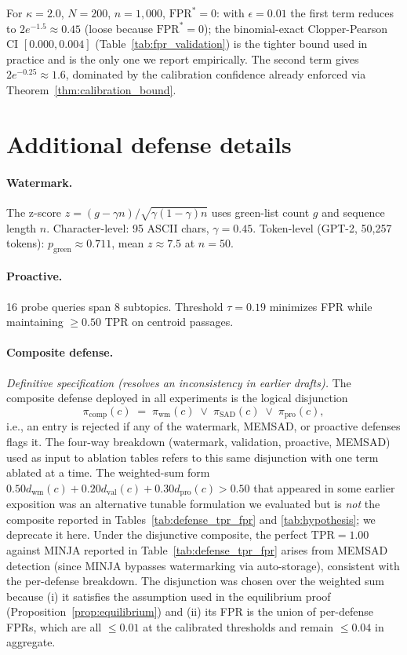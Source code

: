 \documentclass{article}
\theoremstyle{definition}
\newcommand{\tpr}{\text{TPR}}
\newcommand{\fpr}{\text{FPR}}
\newcommand{\minja}{\textsc{MINJA}}
\begin{document}
For $\kappa = 2.0$, $N = 200$, $n = 1{,}000$, $\fpr^* = 0$: with $\epsilon = 0.01$ the first term reduces to $2 e^{-1.5}\approx 0.45$ (loose because $\fpr^* = 0$); the binomial-exact Clopper-Pearson CI $[0.000, 0.004]$ (Table~\ref{tab:fpr_validation}) is the tighter bound used in practice and is the only one we report empirically. The second term gives $2 e^{-0.25} \approx 1.6$, dominated by the calibration confidence already enforced via Theorem~\ref{thm:calibration_bound}.

\section{Additional defense details}
\label{app:defenses}

\paragraph{Watermark.} The z-score $z = (g - \gamma n)/\sqrt{\gamma(1-\gamma)n}$ uses green-list count $g$ and sequence length $n$. Character-level: 95 ASCII chars, $\gamma = 0.45$. Token-level (GPT-2, 50,257 tokens): $p_{\text{green}} \approx 0.711$, mean $z \approx 7.5$ at $n = 50$.

\paragraph{Proactive.} 16 probe queries span 8 subtopics. Threshold $\tau = 0.19$ minimizes FPR while maintaining $\geq 0.50$ TPR on centroid passages.

\paragraph{Composite defense.} \emph{Definitive specification (resolves an inconsistency in earlier drafts).} The composite defense deployed in all experiments is the logical disjunction
\[
  \pi_{\text{comp}}(c) \;=\; \pi_{\text{wm}}(c) \;\lor\; \pi_{\text{SAD}}(c) \;\lor\; \pi_{\text{pro}}(c),
\]
i.e., an entry is rejected if any of the watermark, MEMSAD, or proactive defenses flags it. The four-way breakdown (watermark, validation, proactive, MEMSAD) used as input to ablation tables refers to this same disjunction with one term ablated at a time. The weighted-sum form $0.50 d_{\text{wm}}(c) + 0.20 d_{\text{val}}(c) + 0.30 d_{\text{pro}}(c) > 0.50$ that appeared in some earlier exposition was an alternative tunable formulation we evaluated but is \emph{not} the composite reported in Tables~\ref{tab:defense_tpr_fpr} and \ref{tab:hypothesis}; we deprecate it here. Under the disjunctive composite, the perfect $\tpr = 1.00$ against \minja{} reported in Table~\ref{tab:defense_tpr_fpr} arises from MEMSAD detection (since \minja{} bypasses watermarking via auto-storage), consistent with the per-defense breakdown. The disjunction was chosen over the weighted sum because (i) it satisfies the assumption used in the equilibrium proof (Proposition~\ref{prop:equilibrium}) and (ii) its FPR is the union of per-defense FPRs, which are all $\leq 0.01$ at the calibrated thresholds and remain $\leq 0.04$ in aggregate.
\end{document}
